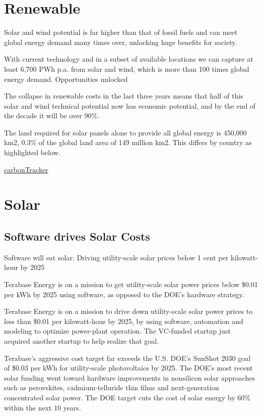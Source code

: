 \documentclass[
]{book}
\begin{document}
\hypertarget{renewable}{%
\chapter{Renewable}\label{renewable}}

Solar and wind potential is far higher than that of fossil fuels and can meet global energy demand many times over, unlocking huge benefits for society.

With current technology and in a subset of available locations we can capture at least 6,700 PWh p.a. from solar and wind, which is more than 100 times global energy demand.
Opportunities unlocked

The collapse in renewable costs in the last three years means that half of this solar and wind technical potential now has economic potential, and by the end of the decade it will be over 90\%.

The land required for solar panels alone to provide all global energy is 450,000 km2, 0.3\% of the global land area of 149 million km2. This differs by country as highlighted below.

\href{https://carbontracker.org/reports/the-skys-the-limit-solar-wind/}{carbonTracker}

\hypertarget{solar}{%
\chapter{Solar}\label{solar}}

\hypertarget{software-drives-solar-costs}{%
\section{Software drives Solar Costs}\label{software-drives-solar-costs}}

Software will eat solar: Driving utility-scale solar prices below 1 cent per kilowatt-hour by 2025

Terabase Energy is on a mission to get utility-scale solar power prices below \$0.01 per kWh by 2025 using software, as opposed to the DOE's hardware strategy.

Terabase Energy is on a mission to drive down utility-scale solar power prices to less than \$0.01 per kilowatt-hour by 2025, by using software, automation and modeling to optimize power-plant operation. The VC-funded startup just acquired another startup to help realize that goal.

Terabase's aggressive cost target far exceeds the U.S. DOE's SunShot 2030 goal of \$0.03 per kWh for utility-scale photovoltaics by 2025. The DOE's most recent solar funding went toward hardware improvements in nonsilicon solar approaches such as perovskites, cadmium-telluride thin films and next-generation concentrated solar power. The DOE target cuts the cost of solar energy by 60\% within the next 10 years.
\end{document}
